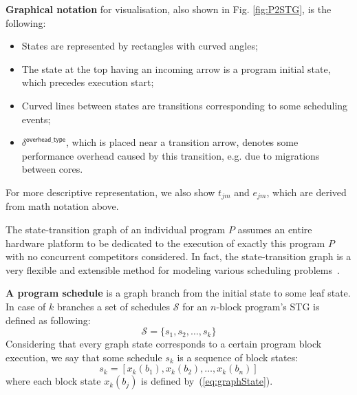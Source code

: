 \textbf{Graphical notation} for visualisation, also shown in Fig. \ref{fig:P2STG}, is the following:
%
\begin{itemize}
\item States are represented by rectangles with curved angles;
\item The state at the top having an incoming arrow is a program initial state, which precedes execution start;
\item Curved lines between states are transitions corresponding to some scheduling events;
\item $\delta^{\mathsf{overhead\_type}}$, which is placed near a transition arrow, denotes some performance overhead caused by this transition, e.g. due to migrations between cores.
\end{itemize}
%
For more descriptive representation, we also show $t_{jm}$ and $e_{jm}$, which are derived from math notation above.


The state-transition graph of an individual program $P$ assumes an entire hardware platform to be dedicated to the execution of exactly this program $P$ with no concurrent competitors considered. In fact, the state-transition graph is a very flexible and extensible method for modeling various scheduling problems~\cite{Burmyakov2021}.

\textbf{A program schedule} is  a graph branch from the initial state to some leaf state. In case of $k$ branches a set of schedules $\mathcal{S}$ for an $n$-block program's STG is defined as following:
%
\begin{equation}
\mathcal{S}=\{ s_1,s_2,\ldots,s_k\}
\end{equation}
%
Considering that every graph state corresponds to a certain program block execution, we say that some schedule $s_k$ is a sequence of block states:
\begin{equation}
s_k = \left[x_k(b_1),x_k(b_2),\ldots,x_k(b_n)\right]
\end{equation}
%
where each block state $x_k(b_j)$ is defined by~(\ref{eq:graphState}).

